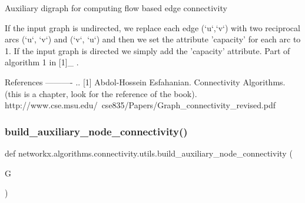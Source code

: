 \begin{DoxyVerb}Auxiliary digraph for computing flow based edge connectivity

If the input graph is undirected, we replace each edge (`u`,`v`) with
two reciprocal arcs (`u`, `v`) and (`v`, `u`) and then we set the attribute
'capacity' for each arc to 1. If the input graph is directed we simply
add the 'capacity' attribute. Part of algorithm 1 in [1]_ .

References
----------
.. [1] Abdol-Hossein Esfahanian. Connectivity Algorithms. (this is a
    chapter, look for the reference of the book).
    http://www.cse.msu.edu/~cse835/Papers/Graph_connectivity_revised.pdf
\end{DoxyVerb}
 \mbox{\label{namespacenetworkx_1_1algorithms_1_1connectivity_1_1utils_adbf9ea0c5fa544037c750c236fda8705}} 
\subsubsection{\texorpdfstring{build\+\_\+auxiliary\+\_\+node\+\_\+connectivity()}{build\_auxiliary\_node\_connectivity()}}
{\footnotesize\ttfamily def networkx.\+algorithms.\+connectivity.\+utils.\+build\+\_\+auxiliary\+\_\+node\+\_\+connectivity (\begin{DoxyParamCaption}\item[{}]{G }\end{DoxyParamCaption})}

